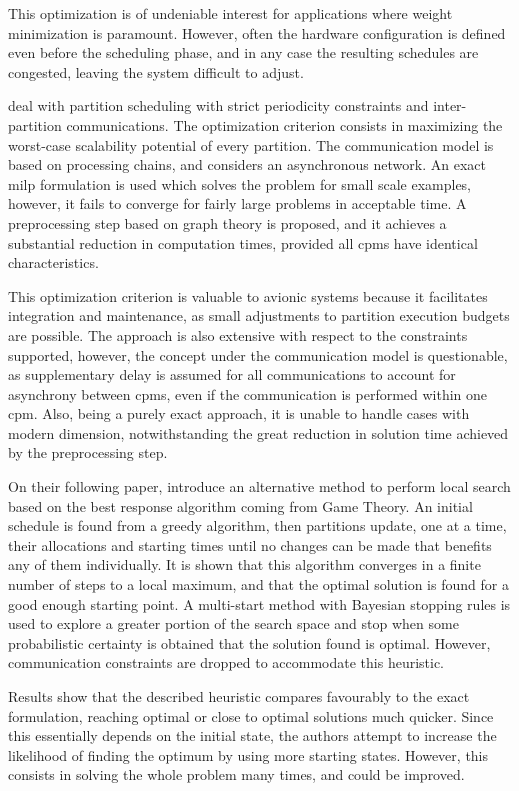 \documentclass[main.tex]{subfiles}
\begin{document}
This optimization is of undeniable interest for applications where weight minimization is paramount.
However, often the hardware configuration is defined even before the scheduling phase, and in any case the resulting schedules are congested, leaving the system difficult to adjust.

\Textcite{al2010partition} deal with partition scheduling with strict periodicity constraints and inter-partition communications.
The optimization criterion consists in maximizing the worst-case scalability potential of every partition.
The communication model is based on processing chains, and considers an asynchronous network.
An exact \gls{milp} formulation is used which solves the problem for small scale examples, however, it fails to converge for fairly large problems in acceptable time.
A preprocessing step based on graph theory is proposed, and it achieves a substantial reduction in computation times, provided all \glspl{cpm} have identical characteristics.

This optimization criterion is valuable to avionic systems because it facilitates integration and maintenance, as small adjustments to partition execution budgets are possible.
The approach is also extensive with respect to the constraints supported, however, the concept under the communication model is questionable, as supplementary delay is assumed for all communications to account for asynchrony between \glspl{cpm}, even if the communication is performed within one \gls{cpm}.
Also, being a purely exact approach, it is unable to handle cases with modern dimension, notwithstanding the great reduction in solution time achieved by the preprocessing step.

On their following paper, \textcite{al2012strictly} introduce an alternative method to perform local search based on the best response algorithm coming from Game Theory.
An initial schedule is found from a greedy algorithm, then partitions update, one at a time, their allocations and starting times until no changes can be made that benefits any of them individually. 
It is shown that this algorithm converges in a finite number of steps to a local maximum, and that the optimal solution is found for a good enough starting point.
A multi-start method with Bayesian stopping rules is used to explore a greater portion of the search space and stop when some probabilistic certainty is obtained that the solution found is optimal.
However, communication constraints are dropped to accommodate this heuristic.

Results show that the described heuristic compares favourably to the exact formulation, reaching optimal or close to optimal solutions much quicker.
Since this essentially depends on the initial state, the authors attempt to increase the likelihood of finding the optimum by using more starting states.
However, this consists in solving the whole problem many times, and could be improved.
\end{document}
